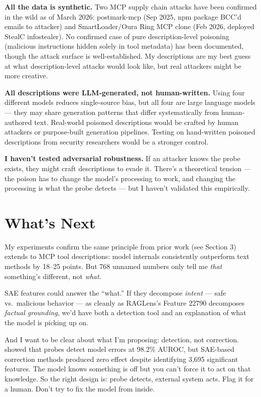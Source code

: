 \documentclass[11pt]{article}
\begin{document}
\textbf{All the data is synthetic.} Two MCP supply chain attacks have been confirmed in the wild as of March 2026: postmark-mcp (Sep 2025, npm package BCC'd emails to attacker) and SmartLoader/Oura Ring MCP clone (Feb 2026, deployed StealC infostealer). No confirmed case of pure description-level poisoning (malicious instructions hidden solely in tool metadata) has been documented, though the attack surface is well-established. My descriptions are my best guess at what description-level attacks would look like, but real attackers might be more creative.

\textbf{All descriptions were LLM-generated, not human-written.} Using four different models reduces single-source bias, but all four are large language models --- they may share generation patterns that differ systematically from human-authored text. Real-world poisoned descriptions would be crafted by human attackers or purpose-built generation pipelines. Testing on hand-written poisoned descriptions from security researchers would be a stronger control.

\textbf{I haven't tested adversarial robustness.} If an attacker knows the probe exists, they might craft descriptions to evade it. There's a theoretical tension --- the poison has to change the model's processing to work, and changing the processing is what the probe detects --- but I haven't validated this empirically.

\section{What's Next}

My experiments confirm the same principle from prior work (see Section 3) extends to MCP tool descriptions: model internals consistently outperform text methods by 18--25 points. But 768 unnamed numbers only tell me \emph{that} something's different, not \emph{what}.

SAE features could answer the ``what.'' If they decompose \emph{intent} --- safe vs.\ malicious behavior --- as cleanly as RAGLens's Feature 22790 decomposes \emph{factual grounding}, we'd have both a detection tool and an explanation of what the model is picking up on.

And I want to be clear about what I'm proposing: detection, not correction. \citet{basu2026interpretability} showed that probes detect model errors at 98.2\% AUROC, but SAE-based correction methods produced zero effect despite identifying 3,695 significant features. The model knows something is off but you can't force it to act on that knowledge. So the right design is: probe detects, external system acts. Flag it for a human. Don't try to fix the model from inside.
\end{document}
